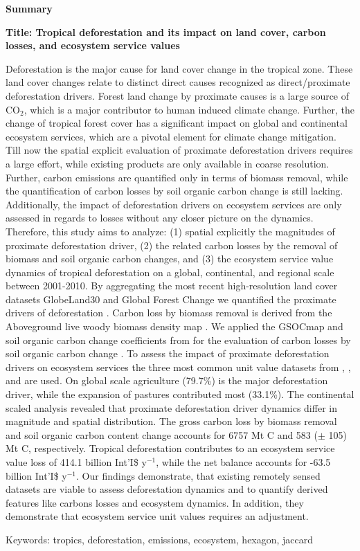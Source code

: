 \thispagestyle{empty}

\begin{center}
	\textbf{Summary}
\end{center}
	\textbf{Title: Tropical deforestation and its impact on land cover, carbon losses, and ecosystem service values}

	Deforestation is the major cause for land cover change in the tropical zone. These land cover changes relate to distinct direct causes recognized as direct/proximate deforestation drivers. Forest land change by proximate causes is a large source of CO$_2$, which is a major contributor to human induced climate change. Further, the change of tropical forest cover has a significant impact on global and continental ecosystem services, which are a pivotal element for climate change mitigation. Till now the spatial explicit evaluation of proximate deforestation drivers requires a large effort, while existing products are only available in coarse resolution. Further, carbon emissions are quantified only in terms of biomass removal, while the quantification of carbon losses by soil organic carbon change is still lacking. Additionally, the impact of deforestation drivers on ecosystem services are only assessed in regards to losses without any closer picture on the dynamics. Therefore, this study aims to analyze: (1) spatial explicitly the magnitudes of proximate deforestation driver, (2) the related carbon losses by the removal of biomass and soil organic carbon changes, and (3) the ecosystem service value dynamics of tropical deforestation on a global, continental, and regional scale between 2001-2010. By aggregating the most recent high-resolution land cover datasets GlobeLand30 and Global Forest Change we quantified the proximate drivers of deforestation \citep{Hansen2013,Chen2015}. Carbon loss by biomass removal is derived from the Aboveground live woody biomass density map \citep{Baccini2015}. We applied the GSOCmap and soil organic carbon change coefficients from \citet{Don2010} for the evaluation of carbon losses by soil organic carbon change \citet{FAO2018}. To assess the impact of proximate deforestation drivers on ecosystem services the three most common unit value datasets from \citet{Costanza2014}, \citet{Groot2012}, and \citet{Siikamaki2015} are used. On global scale agriculture (79.7\%) is the major deforestation driver, while the expansion of pastures contributed most (33.1\%). The continental scaled analysis revealed that proximate deforestation driver dynamics differ in magnitude and spatial distribution. The gross carbon loss by biomass removal and soil organic carbon content change accounts for 6757 Mt C and 583 ($\pm$ 105) Mt C, respectively. Tropical deforestation contributes to an ecosystem service value loss of 414.1 billion Int'I\$ y$^{-1}$, while the net balance accounts for -63.5 billion Int'I\$ y$^{-1}$. Our findings demonstrate, that existing remotely sensed datasets are viable to assess deforestation dynamics and to quantify derived features like carbons losses and ecosystem dynamics. In addition, they demonstrate that ecosystem service unit values requires an adjustment.

	Keywords: tropics, deforestation, emissions, ecosystem, hexagon, jaccard